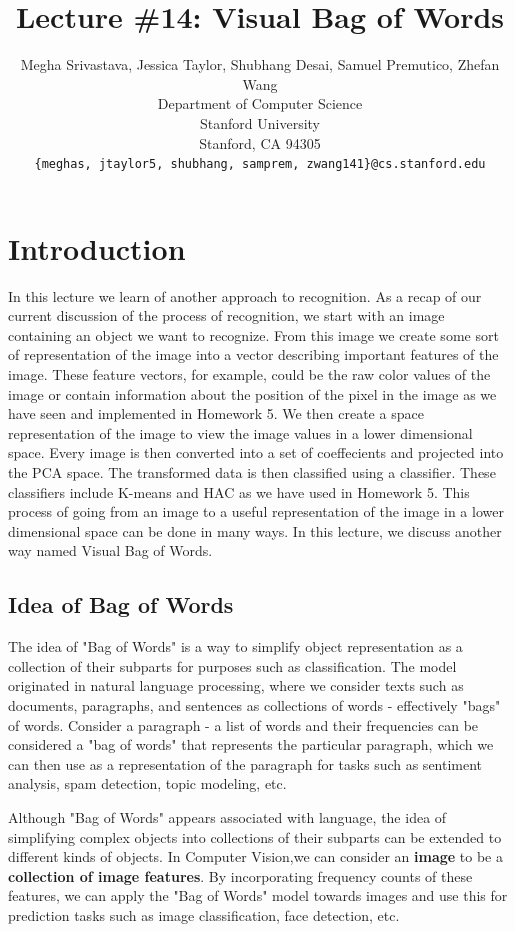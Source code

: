 \documentclass{article}
\title{Lecture \#14: Visual Bag of Words}
\author{
  Megha Srivastava, Jessica Taylor, Shubhang Desai, Samuel Premutico,  Zhefan Wang \\
  Department of Computer Science\\
  Stanford University\\
  Stanford, CA 94305 \\
  \texttt{\{meghas, jtaylor5, shubhang, samprem, zwang141\}@cs.stanford.edu} \\
}
\begin{document}
\maketitle


\section{Introduction}	
In this lecture we learn of another approach to recognition. As a recap of our current discussion of the process of recognition, we start with an image containing an object we want to recognize. From this image we create some sort of representation of the image into a vector describing important features of the image.  These feature vectors, for example, could be the raw color values of the image or contain information about the position of the pixel in the image as we have seen and implemented in Homework 5. We then create a space representation of the image to view the image values in a lower dimensional space.  Every image is then converted into a set of coeffecients and projected into the PCA space.  The transformed data is then classified using a classifier. These classifiers include K-means and HAC as we have used in Homework 5.  This process of going from an image to a useful representation of the image in a lower dimensional space can be done in many ways.  In this lecture, we discuss another way named Visual Bag of Words.

\subsection{Idea of Bag of Words}
The idea of "Bag of Words" is a way to simplify object representation as a collection of their subparts for purposes such as classification. The model originated in natural language processing, where we consider texts such as documents, paragraphs, and sentences as collections of words - effectively "bags" of words. Consider a paragraph - a list of words and their frequencies can be considered a "bag of words" that represents the particular paragraph, which we can then use as a representation of the paragraph for tasks such as sentiment analysis, spam detection, topic modeling, etc. 

Although "Bag of Words" appears associated with language, the idea of simplifying complex objects into collections of their subparts can be extended to different kinds of objects. In Computer Vision,we can consider an \textbf{image} to be a \textbf{collection of image features}. By incorporating frequency counts of these features, we can apply the "Bag of Words" model towards images and use this for prediction tasks such as image classification, face detection, etc.
\end{document}
